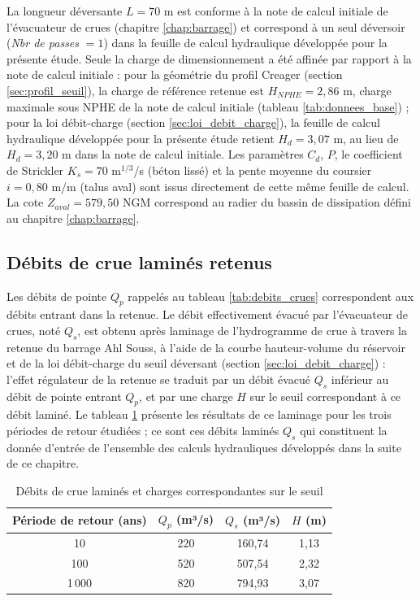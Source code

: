 La longueur déversante $L = 70$ m est conforme à la note de calcul initiale de l'évacuateur de crues (chapitre \ref{chap:barrage}) et correspond à un seul déversoir (\textit{Nbr de passes} $= 1$) dans la feuille de calcul hydraulique développée pour la présente étude. Seule la charge de dimensionnement a été affinée par rapport à la note de calcul initiale : pour la géométrie du profil Creager (section \ref{sec:profil_seuil}), la charge de référence retenue est $H_{NPHE} = 2{,}86$ m, charge maximale sous NPHE de la note de calcul initiale (tableau \ref{tab:donnees_base}) ; pour la loi débit-charge (section \ref{sec:loi_debit_charge}), la feuille de calcul hydraulique développée pour la présente étude retient $H_d = 3{,}07$ m, au lieu de $H_d = 3{,}20$ m dans la note de calcul initiale. Les paramètres $C_d$, $P$, le coefficient de Strickler $K_s = 70$ m$^{1/3}$/s (béton lissé) et la pente moyenne du coursier $i = 0{,}80$ m/m (talus aval) sont issus directement de cette même feuille de calcul. La cote $Z_{aval} = 579{,}50$ NGM correspond au radier du bassin de dissipation défini au chapitre \ref{chap:barrage}.

\subsection{Débits de crue laminés retenus}
\label{subsec:debits_lamines}

Les débits de pointe $Q_p$ rappelés au tableau \ref{tab:debits_crues} correspondent aux débits entrant dans la retenue. Le débit effectivement évacué par l'évacuateur de crues, noté $Q_s$, est obtenu après laminage de l'hydrogramme de crue à travers la retenue du barrage Ahl Souss, à l'aide de la courbe hauteur-volume du réservoir et de la loi débit-charge du seuil déversant (section \ref{sec:loi_debit_charge}) : l'effet régulateur de la retenue se traduit par un débit évacué $Q_s$ inférieur au débit de pointe entrant $Q_p$, et par une charge $H$ sur le seuil correspondant à ce débit laminé. Le tableau \ref{tab:debits_lamines} présente les résultats de ce laminage pour les trois périodes de retour étudiées ; ce sont ces débits laminés $Q_s$ qui constituent la donnée d'entrée de l'ensemble des calculs hydrauliques développés dans la suite de ce chapitre.

\begin{table}[H]
    \centering
    \caption{Débits de crue laminés et charges correspondantes sur le seuil}
    \label{tab:debits_lamines}
    \begin{tabular}{|c|c|c|c|}
        \hline
        \textbf{Période de retour (ans)} & \textbf{$Q_p$ (m³/s)} & \textbf{$Q_s$ (m³/s)} & \textbf{$H$ (m)} \\
        \hline
        10 & 220 & 160,74 & 1,13 \\
        \hline
        100 & 520 & 507,54 & 2,32 \\
        \hline
        1\,000 & 820 & 794,93 & 3,07 \\
        \hline
    \end{tabular}
\end{table}

